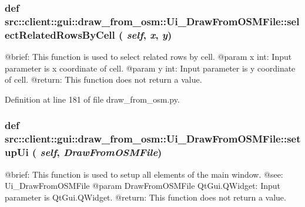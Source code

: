 \hypertarget{classsrc_1_1client_1_1gui_1_1draw__from__osm_1_1Ui__DrawFromOSMFile_a9c4d0284aa451139fc08280cc4381d7f}{
\subsubsection[{selectRelatedRowsByCell}]{\setlength{\rightskip}{0pt plus 5cm}def src::client::gui::draw\_\-from\_\-osm::Ui\_\-DrawFromOSMFile::selectRelatedRowsByCell ( {\em self}, \/   {\em x}, \/   {\em y})}}
\label{classsrc_1_1client_1_1gui_1_1draw__from__osm_1_1Ui__DrawFromOSMFile_a9c4d0284aa451139fc08280cc4381d7f}
\begin{DoxyVerb}
@brief: This function is used to select related rows by cell.
@param x int: Input parameter is x coordinate of cell.
@param y int: Input parameter is y coordinate of cell. 
@return: This function does not return a value.
\end{DoxyVerb}
 

Definition at line 181 of file draw\_\-from\_\-osm.py.

\hypertarget{classsrc_1_1client_1_1gui_1_1draw__from__osm_1_1Ui__DrawFromOSMFile_a7af7cb45df7e06eeef1c155e49a2aafb}{
\subsubsection[{setupUi}]{\setlength{\rightskip}{0pt plus 5cm}def src::client::gui::draw\_\-from\_\-osm::Ui\_\-DrawFromOSMFile::setupUi ( {\em self}, \/   {\em DrawFromOSMFile})}}
\label{classsrc_1_1client_1_1gui_1_1draw__from__osm_1_1Ui__DrawFromOSMFile_a7af7cb45df7e06eeef1c155e49a2aafb}
\begin{DoxyVerb}
@brief: This function is used to setup all elements of the main window.
@see: Ui_DrawFromOSMFile
@param DrawFromOSMFile QtGui.QWidget: Input parameter is QtGui.QWidget.
@return: This function does not return a value. 
\end{DoxyVerb}
 

